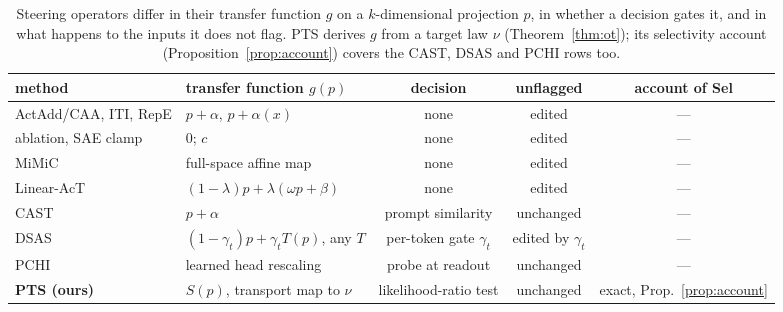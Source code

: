 \documentclass{article}
\begin{document}
\begin{table}[t]\footnotesize\setlength{\tabcolsep}{3.5pt}
\centering
\begin{tabular}{l|l|c|c|c}
\hline
method & transfer function $g(p)$ & decision & unflagged & account of Sel \\
\hline
ActAdd/CAA, ITI, RepE & $p+\alpha$, $p+\alpha(x)$ & none & edited & --- \\
ablation, SAE clamp & $0$; $c$ & none & edited & --- \\
MiMiC & full-space affine map & none & edited & --- \\
Linear-AcT & $(1{-}\lambda)p+\lambda(\omega p+\beta)$ & none & edited & --- \\
CAST & $p+\alpha$ & prompt similarity & unchanged & --- \\
DSAS & $(1{-}\gamma_t)p+\gamma_t T(p)$, any $T$ & per-token gate $\gamma_t$ & edited by $\gamma_t$ & --- \\
PCHI & learned head rescaling & probe at readout & unchanged & --- \\
\hline
\textbf{PTS (ours)} & $S(p)$, transport map to $\nu$ & likelihood-ratio test & unchanged & exact, Prop.~\ref{prop:account} \\
\hline
\end{tabular}
\caption{Steering operators differ in their transfer function $g$ on a
$k$-dimensional projection $p$, in whether a decision gates it, and in what
happens to the inputs it does not flag. PTS derives $g$ from a target law
$\nu$ (Theorem~\ref{thm:ot}); its selectivity account
(Proposition~\ref{prop:account}) covers the CAST, DSAS and PCHI rows too.}
\label{tab:family}
\end{table}
\end{document}
